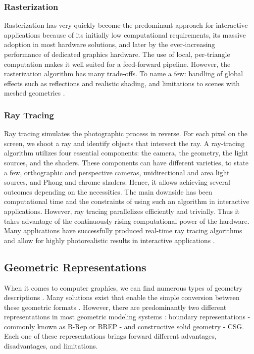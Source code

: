 \documentclass[a4paper,11pt,oneside]{article}
\begin{document}
\subsubsection{Rasterization}
    
Rasterization has very quickly become the predominant approach for interactive applications because of its initially low computational requirements, its massive adoption in most hardware solutions, and later by the ever-increasing performance of dedicated graphics hardware. The use of local, per-triangle computation makes it well suited for a feed-forward pipeline. However, the rasterization algorithm has many trade-offs. To name a few: handling of global effects such as reflections and realistic shading, and limitations to scenes with meshed geometries \cite{rasterization_scratch_pixel}. 
    
\subsubsection{Ray Tracing}
     
Ray tracing simulates the photographic process in reverse. For each pixel on the screen, we shoot a ray and identify objects that intersect the ray. A ray-tracing algorithm utilizes four essential components: the camera, the geometry, the light sources, and the shaders. These components can have different varieties, to state a few, orthographic and perspective cameras, unidirectional and area light sources, and Phong and chrome shaders. Hence, it allows achieving several outcomes depending on the necessities. The main downside has been computational time and the constraints of using such an algorithm in interactive applications. However, ray tracing parallelizes efficiently and trivially. Thus it takes advantage of the continuously rising computational power of the hardware. Many applications have successfully produced real-time ray tracing algorithms and allow for highly photorealistic results in interactive applications \cite{RT_RT1, RT_RT2}.
    
  
\subsection{Geometric Representations}
\label{sec:geometric_represections}

When it comes to computer graphics, we can find numerous types of geometry descriptions \cite{SOLIDREP_5, SOLIDREP_1, SOLIDREP_2, SOLIDREP_3, COMPUTING_SURVEYS,SOLIDREP_4}. Many solutions exist that enable the simple conversion between these geometric formats \cite{steuer_2012}. However, there are predominantly two different representations in most geometric modeling systems \cite{COMPUTING_SURVEYS}: boundary representations - commonly known as B-Rep or BREP - and constructive solid geometry - CSG. Each one of these representations brings forward different advantages, disadvantages, and limitations.
    
\end{document}
